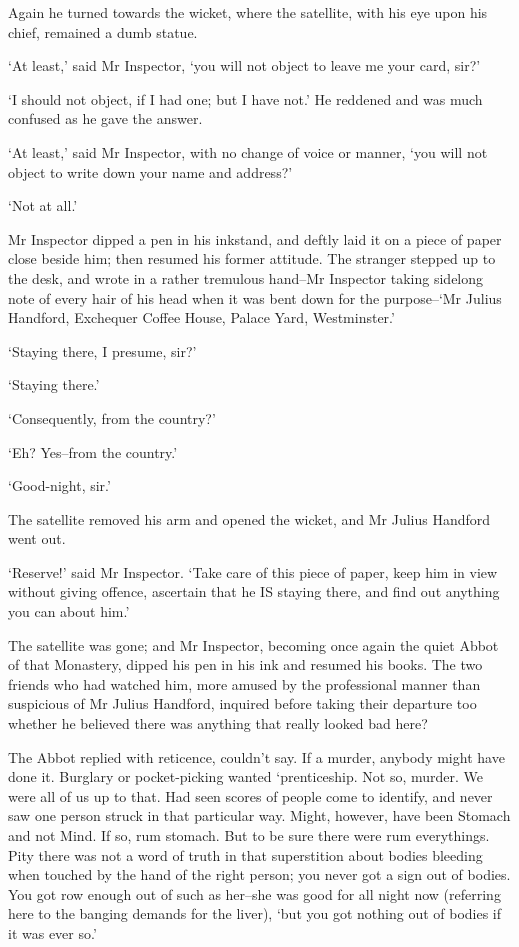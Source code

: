 Again he turned towards the wicket, where the satellite, with his eye
upon his chief, remained a dumb statue.

‘At least,’ said Mr Inspector, ‘you will not object to leave me your
card, sir?’

‘I should not object, if I had one; but I have not.’ He reddened and was
much confused as he gave the answer.

‘At least,’ said Mr Inspector, with no change of voice or manner, ‘you
will not object to write down your name and address?’

‘Not at all.’

Mr Inspector dipped a pen in his inkstand, and deftly laid it on a
piece of paper close beside him; then resumed his former attitude.
The stranger stepped up to the desk, and wrote in a rather tremulous
hand--Mr Inspector taking sidelong note of every hair of his head when
it was bent down for the purpose--‘Mr Julius Handford, Exchequer Coffee
House, Palace Yard, Westminster.’

‘Staying there, I presume, sir?’

‘Staying there.’

‘Consequently, from the country?’

‘Eh? Yes--from the country.’

‘Good-night, sir.’

The satellite removed his arm and opened the wicket, and Mr Julius
Handford went out.

‘Reserve!’ said Mr Inspector. ‘Take care of this piece of paper, keep
him in view without giving offence, ascertain that he IS staying there,
and find out anything you can about him.’

The satellite was gone; and Mr Inspector, becoming once again the quiet
Abbot of that Monastery, dipped his pen in his ink and resumed
his books. The two friends who had watched him, more amused by the
professional manner than suspicious of Mr Julius Handford, inquired
before taking their departure too whether he believed there was anything
that really looked bad here?

The Abbot replied with reticence, couldn’t say. If a murder, anybody
might have done it. Burglary or pocket-picking wanted ‘prenticeship. Not
so, murder. We were all of us up to that. Had seen scores of people come
to identify, and never saw one person struck in that particular way.
Might, however, have been Stomach and not Mind. If so, rum stomach.
But to be sure there were rum everythings. Pity there was not a word
of truth in that superstition about bodies bleeding when touched by the
hand of the right person; you never got a sign out of bodies. You got
row enough out of such as her--she was good for all night now (referring
here to the banging demands for the liver), ‘but you got nothing out of
bodies if it was ever so.’

